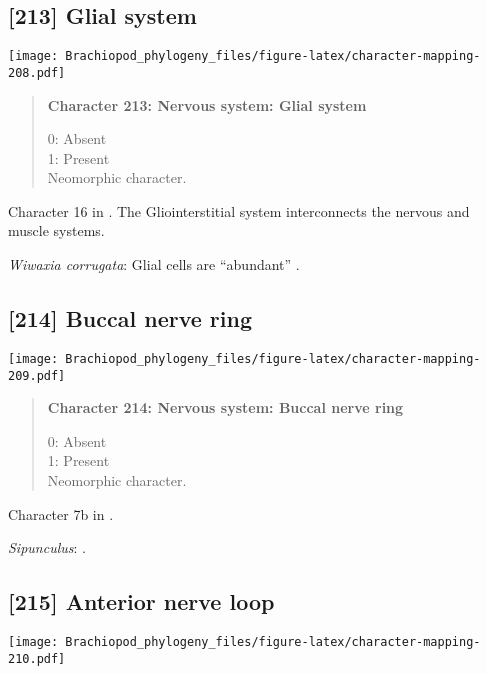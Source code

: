 \documentclass[openany]{book}
\theoremstyle{definition}
\theoremstyle{definition}
\theoremstyle{definition}
\theoremstyle{remark}
\begin{document}
\subsection*{{[}213{]} Glial system}\label{glial-system}

\texttt{[image: Brachiopod\_phylogeny\_files/figure-latex/character-mapping-208.pdf]}

\begin{quote}
\textbf{Character 213: Nervous system: Glial system}

0: Absent\\
1: Present\\
Neomorphic character.
\end{quote}

Character 16 in \citet{Haszprunar1996}. The Gliointerstitial system
interconnects the nervous and muscle systems.

\hypertarget{Wiwaxia_corrugata-coding-213}{}
\emph{Wiwaxia corrugata}: Glial cells are ``abundant''
\citep{Temereva2016Phoronida}.

\subsection*{{[}214{]} Buccal nerve ring}\label{buccal-nerve-ring}

\texttt{[image: Brachiopod\_phylogeny\_files/figure-latex/character-mapping-209.pdf]}

\begin{quote}
\textbf{Character 214: Nervous system: Buccal nerve ring}

0: Absent\\
1: Present\\
Neomorphic character.
\end{quote}

Character 7b in \citet{Haszprunar2008}.

\hypertarget{Sipunculus-coding-214}{}
\emph{Sipunculus}: \citet{Temereva2016Thenervous}.

\subsection*{{[}215{]} Anterior nerve loop}\label{anterior-nerve-loop}

\texttt{[image: Brachiopod\_phylogeny\_files/figure-latex/character-mapping-210.pdf]}
\end{document}
